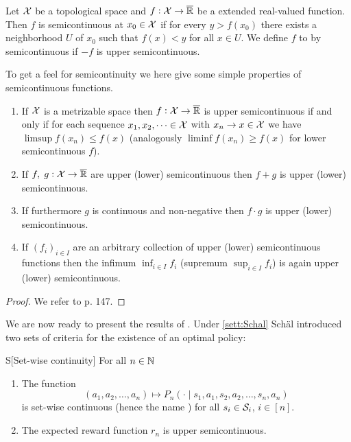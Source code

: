 \begin{defn}[Semicontinuity]
  Let $\mathcal{X}$ be a topological space and $f : \mathcal{X} \to \overline{\mathbb{R}}$ be a
  extended real-valued function.
  Then $f$ is  semicontinuous
  at $x_0 \in \mathcal{X}$ if for every $y > f(x_0)$ there exists a neighborhood
  $U$ of $x_0$ such that $f(x) < y$ for all $x \in U$.
  We define $f$ to by  semicontinuous if
  $-f$ is upper semicontinuous.
\end{defn}
To get a feel for semicontinuity we here
give some simple properties of semicontinuous functions.
\begin{prop}
  \leavevmode
  \begin{enumerate}
    \item If $\mathcal{X}$ is a metrizable space then
      $f : \mathcal{X} \to \overline{\mathbb{R}}$ is upper semicontinuous if and only
      if for each sequence $x_1, x_2, \dots \in \mathcal{X}$
      with $x_n \to x \in \mathcal{X}$ we have $\limsup f(x_n) \leq f(x)$
      (analogously $\liminf f(x_n) \geq f(x)$ for lower semicontinuous $f$).
    \item If $f,\; g : \mathcal{X} \to \overline{\mathbb{R}}$ are upper (lower) semicontinuous then
      $f + g$ is upper (lower) semicontinuous.
    \item If furthermore $g$ is continuous and non-negative then
      $f \cdot g$ is upper (lower) semicontinuous.
    \item If $(f_i)_{i \in I}$ are an arbitrary collection of upper (lower)
      semicontinuous functions then the infimum $\inf_{i \in I} f_i$
      (supremum $\sup_{i \in I} f_i$) is again upper (lower) semicontinuous.
  \end{enumerate}
  \label{prop:sumProdSemiC}
\end{prop}
\begin{proof}
  We refer to  p. 147.
\end{proof}

We are now ready to present the results of .
Under \cref{sett:Schal} Schäl introduced two sets of criteria for the existence
of an optimal policy:

\begin{cond}{S}[Set-wise continuity]
  For all $n \in \mathbb{N}$ 
  \begin{enumerate}
    \item The function \[
	(a_1, a_2, \dots, a_n) \mapsto
	P_n(\cdot \mid s_1, a_1, s_2, a_2, \dots, s_n, a_n)
      \]
      is set-wise continuous (hence the name )
      for all $s_i \in \mathcal{S}_i$, $i \in [n]$.
    \item The expected reward function $r_n$ is upper semicontinuous.
  \end{enumerate}
  \label{cond:S}
\end{cond}

